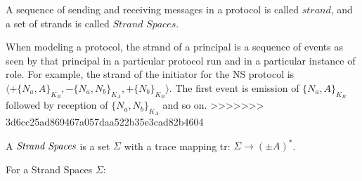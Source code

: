A sequence of sending and receiving messages in a protocol is called $strand$, and a set of strands is called $\textit{Strand Spaces}$. 

When modeling a protocol, the strand of a principal is a sequence of events as seen by that principal in a particular protocol run and in a particular instance of role. For example, the strand of the initiator for the NS protocol is $\langle+\{N_a,A\}_{K_B}, -\{N_a,N_b\}_{K_A},+\{N_b\}_{K_B} \rangle$. The first event is emission of $\{N_a,A\}_{K_B}$ followed by reception of $\{N_a,N_b\}_{K_A}$ and so on. 
>>>>>>> 3d6cc25ad869467a057daa522b35e3cad82b4604

\begin{Definition}
A $\emph{Strand Spaces}$ is a set $\Sigma$ with a trace mapping tr: $\Sigma \rightarrow (\pm A)^*$.
\end{Definition}

For a Strand Spaces $\Sigma$:

